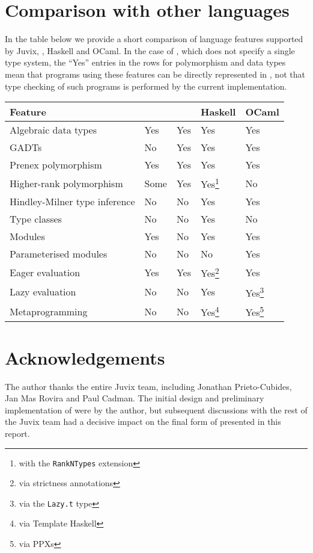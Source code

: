 \documentclass[
    9pt,            %
    techreport,        %
    affiltop,       %
]{art}
\begin{document}
\section{Comparison with other languages}\label{sec_comparison}

In the table below we provide a short comparison of language features supported by Juvix, \JuvixCore{}, Haskell and OCaml. In the case of \JuvixCore{}, which does not specify a single type system, the ``Yes'' entries in the rows for polymorphism and data types mean that programs using these features can be directly represented in \JuvixCore{}, not that type checking of such programs is performed by the current \JuvixCore{} implementation.

\vspace*{2mm}
\begin{minipage}[b]{\hsize}\centering

\begin{tabular}{lllll}
\hline
\textbf{Feature} & \textbf{\Juvix{}} & \textbf{\JuvixCore{}} & \textbf{Haskell} & \textbf{OCaml} \\ \hline
Algebraic data types  &  Yes   &  Yes   &  Yes  & Yes \\
GADTs  &  No   &  Yes   &  Yes &  Yes  \\
Prenex polymorphism  &  Yes   &  Yes &  Yes  &  Yes \\
Higher-rank polymorphism  &  Some   &  Yes   &  Yes\footnote{with the \texttt{RankNTypes} extension}  &   No  \\
Hindley-Milner type inference & No & No & Yes & Yes \\
Type classes  &  No   &  No   &  Yes &   No \\
Modules  &  Yes   &  No   &  Yes &   Yes \\
Parameterised modules  &  No   &  No   &  No &   Yes \\
Eager evaluation  &  Yes   &  Yes   &  Yes\footnote{via strictness annotations} &   Yes \\
Lazy evaluation  &  No  &  No &  Yes &   Yes\footnote{via the \texttt{Lazy.t} type} \\
Metaprogramming  &  No   &  No   &  Yes\footnote{via Template Haskell} &  Yes\footnote{via PPXs} \\
\hline
\end{tabular}
\end{minipage}


\section*{Acknowledgements}

The author thanks the entire Juvix team, including Jonathan Prieto-Cubides, Jan Mas Rovira and Paul Cadman. The initial design and preliminary implementation of \JuvixCore{} were by the author, but subsequent discussions with the rest of the Juvix team had a decisive impact on the final form of \JuvixCore{} presented in this report.

\nocite{*}

\end{document}
